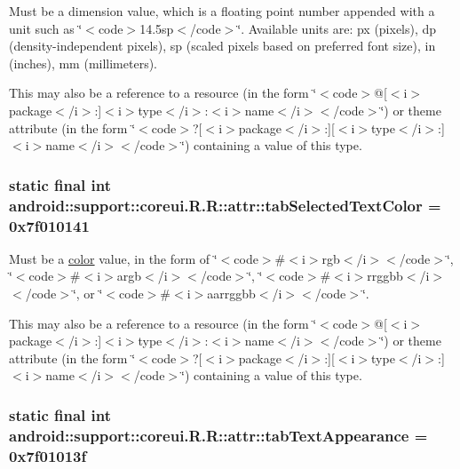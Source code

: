 Must be a dimension value, which is a floating point number appended with a unit such as \char`\"{}$<$code$>$14.5sp$<$/code$>$\char`\"{}. Available units are: px (pixels), dp (density-independent pixels), sp (scaled pixels based on preferred font size), in (inches), mm (millimeters). 

This may also be a reference to a resource (in the form \char`\"{}$<$code$>$@\mbox{[}$<$i$>$package$<$/i$>$:\mbox{]}$<$i$>$type$<$/i$>$:$<$i$>$name$<$/i$>$$<$/code$>$\char`\"{}) or theme attribute (in the form \char`\"{}$<$code$>$?\mbox{[}$<$i$>$package$<$/i$>$:\mbox{]}\mbox{[}$<$i$>$type$<$/i$>$:\mbox{]}$<$i$>$name$<$/i$>$$<$/code$>$\char`\"{}) containing a value of this type. \hypertarget{classandroid_1_1support_1_1coreui_1_1_r_1_1attr_98fb322402d45d8fa4a03460f5862bb8}{
\subsubsection[{tabSelectedTextColor}]{\setlength{\rightskip}{0pt plus 5cm}static final int android::support::coreui.R.R::attr::tabSelectedTextColor = 0x7f010141}}
\label{classandroid_1_1support_1_1coreui_1_1_r_1_1attr_98fb322402d45d8fa4a03460f5862bb8}


Must be a \hyperlink{classandroid_1_1support_1_1coreui_1_1_r_1_1color}{color} value, in the form of \char`\"{}$<$code$>$\#$<$i$>$rgb$<$/i$>$$<$/code$>$\char`\"{}, \char`\"{}$<$code$>$\#$<$i$>$argb$<$/i$>$$<$/code$>$\char`\"{}, \char`\"{}$<$code$>$\#$<$i$>$rrggbb$<$/i$>$$<$/code$>$\char`\"{}, or \char`\"{}$<$code$>$\#$<$i$>$aarrggbb$<$/i$>$$<$/code$>$\char`\"{}. 

This may also be a reference to a resource (in the form \char`\"{}$<$code$>$@\mbox{[}$<$i$>$package$<$/i$>$:\mbox{]}$<$i$>$type$<$/i$>$:$<$i$>$name$<$/i$>$$<$/code$>$\char`\"{}) or theme attribute (in the form \char`\"{}$<$code$>$?\mbox{[}$<$i$>$package$<$/i$>$:\mbox{]}\mbox{[}$<$i$>$type$<$/i$>$:\mbox{]}$<$i$>$name$<$/i$>$$<$/code$>$\char`\"{}) containing a value of this type. \hypertarget{classandroid_1_1support_1_1coreui_1_1_r_1_1attr_31c75a5ae1bb1986d7328b1964ae539d}{
\subsubsection[{tabTextAppearance}]{\setlength{\rightskip}{0pt plus 5cm}static final int android::support::coreui.R.R::attr::tabTextAppearance = 0x7f01013f}}
\label{classandroid_1_1support_1_1coreui_1_1_r_1_1attr_31c75a5ae1bb1986d7328b1964ae539d}



